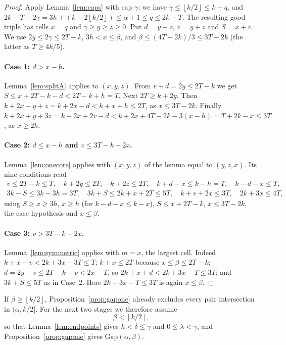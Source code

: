 \documentclass[11pt]{article}
\numberwithin{equation}{section}
\theoremstyle{definition}
\theoremstyle{remark}
\newcommand{\floor}[1]{\left\lfloor #1\right\rfloor}
\newcommand{\Gap}{\mathrm{Gap}}
\begin{document}
\begin{proof}
Apply Lemma~\ref{lem:caps} with cap $\gamma$: we have
$\gamma\le\floor{k/2}\le k-q$, and
$2k-T-2\gamma=3h+(k-2\floor{k/2})\le\alpha+1\le q\le2k-T$. The resulting
good triple has cells $x=q$ and $\gamma\ge y\ge z\ge0$. Put $d=y-z$,
$v=y+z$ and $S=x+v$. We use $2y\le2\gamma\le2T-k$, $3h<x\le\beta$, and
$\beta\le(4T-2k)/3\le3T-2k$ (the latter as $T\ge4k/5$).

\paragraph{Case 1: $d>x-h$.} Lemma~\ref{lem:splitA} applies to $(x,y,z)$.
From $v+d=2y\le2T-k$ we get $S\le x+2T-k-d<2T-k+h=T$. Next $2T\ge k+2y$.
Then $k+2x-y+z=k+2x-d<k+x+h\le2T$, as $x\le3T-2k$. Finally
$k+2x+y+3z=k+2x+2v-d<k+2x+4T-2k-3(x-h)=T+2k-x\le3T$, as $x\ge2h$.

\paragraph{Case 2: $d\le x-h$ and $v\le3T-k-2x$.} Lemma~\ref{lem:onecore}
applies with $(x,y,z)$ of the lemma equal to $(y,z,x)$. Its nine
conditions read
\begin{gather*}
 v\le2T-k\le T,\quad k+2y\le2T,\quad k+2z\le2T,\quad
 k+d-x\le k-h=T,\quad k-d-x\le T,\\
 3k-S\le3k-3h=3T,\quad 3k+S\le2k+x+2T\le5T,\quad k+v+2x\le3T,\quad
 2k+3x\le4T,
\end{gather*}
using $S\ge x\ge3h$, $x\ge h$ (for $k-d-x\le k-x$), $S\le x+2T-k$,
$x\le3T-2k$, the case hypothesis and $x\le\beta$.

\paragraph{Case 3: $v>3T-k-2x$.} Lemma~\ref{lem:symmetric} applies with
$m=x$, the largest cell. Indeed $k+x-v<2k+3x-3T\le T$; $k+x\le2T$ because
$x\le\beta\le2T-k$; $d=2y-v\le2T-k-v<2x-T$, so $2k+x+d<2k+3x-T\le3T$; and
$3k+S\le5T$ as in Case~2. Here $2k+3x-T\le3T$ is again $x\le\beta$.
\end{proof}

If $\beta\ge\floor{k/2}$, Proposition~\ref{prop:gapone} already excludes
every pair intersection in $(\alpha,k/2]$. For the next two stages we
therefore assume
\begin{equation}\label{eq:branch}
 \beta<\floor{k/2},
\end{equation}
so that Lemma~\ref{lem:endpoints} gives $h<\delta\le\gamma$ and
$0\le\lambda<\gamma$, and Proposition~\ref{prop:gapone} gives
$\Gap(\alpha,\beta)$.
\end{document}
